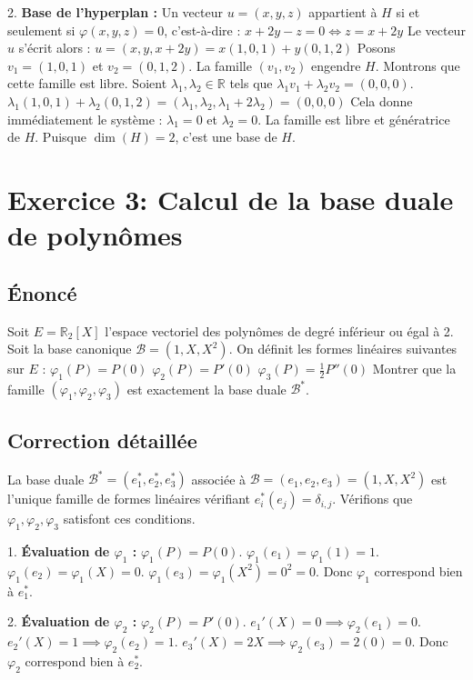 \documentclass{report}
\begin{document}
2. \textbf{Base de l'hyperplan :}
   Un vecteur $u = (x, y, z)$ appartient à $H$ si et seulement si $\varphi(x, y, z) = 0$, c'est-à-dire :
   $x + 2y - z = 0 \iff z = x + 2y$
   Le vecteur $u$ s'écrit alors :
   $u = (x, y, x + 2y) = x(1, 0, 1) + y(0, 1, 2)$
   Posons $v_1 = (1, 0, 1)$ et $v_2 = (0, 1, 2)$.
   La famille $(v_1, v_2)$ engendre $H$.
   Montrons que cette famille est libre. Soient $\lambda_1, \lambda_2 \in \mathbb{R}$ tels que $\lambda_1 v_1 + \lambda_2 v_2 = (0, 0, 0)$.
   $\lambda_1(1, 0, 1) + \lambda_2(0, 1, 2) = (\lambda_1, \lambda_2, \lambda_1 + 2\lambda_2) = (0, 0, 0)$
   Cela donne immédiatement le système :
   $\lambda_1 = 0$ et $\lambda_2 = 0$.
   La famille est libre et génératrice de $H$. Puisque $\dim(H) = 2$, c'est une base de $H$.


\newpage
\chapter*{Exercice 3: Calcul de la base duale de polynômes}
\section*{Énoncé}
Soit $E = \mathbb{R}_2[X]$ l'espace vectoriel des polynômes de degré inférieur ou égal à 2.
Soit la base canonique $\mathcal{B} = (1, X, X^2)$. On définit les formes linéaires suivantes sur $E$ :
$\varphi_1(P) = P(0)$
$\varphi_2(P) = P'(0)$
$\varphi_3(P) = \frac{1}{2}P''(0)$
Montrer que la famille $(\varphi_1, \varphi_2, \varphi_3)$ est exactement la base duale $\mathcal{B}^*$.


\section*{Correction détaillée}
La base duale $\mathcal{B}^* = (e_1^*, e_2^*, e_3^*)$ associée à $\mathcal{B} = (e_1, e_2, e_3) = (1, X, X^2)$ est l'unique famille de formes linéaires vérifiant $e_i^*(e_j) = \delta_{i,j}$.
Vérifions que $\varphi_1, \varphi_2, \varphi_3$ satisfont ces conditions.

1. \textbf{Évaluation de $\varphi_1$ :}
   $\varphi_1(P) = P(0)$.
   $\varphi_1(e_1) = \varphi_1(1) = 1$.
   $\varphi_1(e_2) = \varphi_1(X) = 0$.
   $\varphi_1(e_3) = \varphi_1(X^2) = 0^2 = 0$.
   Donc $\varphi_1$ correspond bien à $e_1^*$.

2. \textbf{Évaluation de $\varphi_2$ :}
   $\varphi_2(P) = P'(0)$.
   $e_1'(X) = 0 \implies \varphi_2(e_1) = 0$.
   $e_2'(X) = 1 \implies \varphi_2(e_2) = 1$.
   $e_3'(X) = 2X \implies \varphi_2(e_3) = 2(0) = 0$.
   Donc $\varphi_2$ correspond bien à $e_2^*$.
\end{document}
